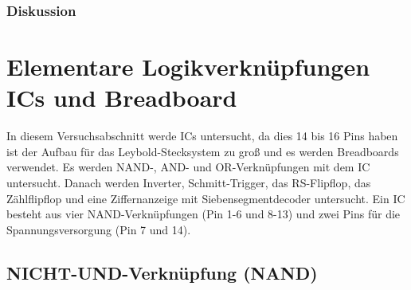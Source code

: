 \documentclass[12pt,a4paper]{article}
\begin{document}
\subsubsection*{Diskussion}



\section{Elementare Logikverknüpfungen ICs und Breadboard}

In diesem Versuchsabschnitt werde ICs untersucht, da dies 14 bis 16 Pins haben ist der Aufbau für das Leybold-Stecksystem zu groß und es werden Breadboards verwendet. Es werden NAND-, AND- und OR-Verknüpfungen mit dem IC untersucht. Danach werden Inverter, Schmitt-Trigger, das RS-Flipflop, das Zählflipflop und eine Ziffernanzeige mit Siebensegmentdecoder untersucht. Ein IC besteht aus vier NAND-Verknüpfungen (Pin 1-6 und 8-13) und zwei Pins für die Spannungsversorgung (Pin 7 und 14).

\subsection{NICHT-UND-Verknüpfung (NAND)}
\end{document}
